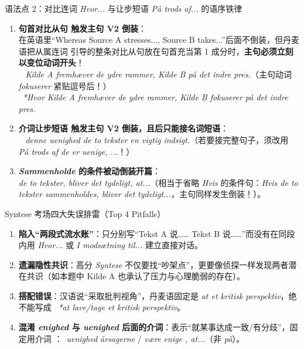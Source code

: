 \begin{grammatikbox}{语法点 2：对比连词 \textit{Hvor...} 与让步短语 \textit{På trods af...} 的语序铁律}
\begin{enumerate}
  \item \textbf{句首对比从句  触发主句 V2 倒装}：\\
    在英语里“Whereas Source A stresses..., Source B takes...”后面不倒装，但丹麦语把从属连词  引导的整条对比从句放在句首充当第 1 成分时，\textbf{主句必须立刻以变位动词开头}！\\
    \ \textit{ Kilde A fremhæver de ydre rammer,  Kilde B på det indre pres.}（主句动词 \textit{fokuserer} 紧贴逗号后！）\\
    \ \textit{*Hvor Kilde A fremhæver de ydre rammer, Kilde B fokuserer på det indre pres.}
  \item \textbf{介词让步短语  触发主句 V2 倒装，且后只能接名词短语}：\\
    \ \textit{ denne uenighed  de to tekster en vigtig indsigt.}（若要接完整句子，须改用 \textit{På trods af  de er uenige, ...}！）
  \item \textbf{\textit{Sammenholde} 的条件被动倒装开篇}：\\
    \textit{ de to tekster, bliver det tydeligt, at...}（相当于省略 \textit{Hvis} 的条件句：\textit{Hvis de to tekster sammenholdes, bliver det tydeligt...}，主句同样发生倒装！）。
\end{enumerate}
\end{grammatikbox}

\begin{grammatikbox}{Syntese 考场四大失误排雷（Top 4 Pitfalls）}
\begin{enumerate}
  \item \textbf{ 陷入“两段式流水账”}：只分别写“Tekst A 说…… Tekst B 说……”而没有在同段内用 \textit{Hvor...} 或 \textit{I modsætning til...} 建立直接对话。
  \item \textbf{ 遗漏隐性共识}：高分 \textit{Syntese} 不仅要找“吵架点”，更要像侦探一样发现两者潜在共识（如本题中 Kilde A 也承认了压力与心理脆弱的存在）。
  \item \textbf{ 搭配错误}：汉语说“采取批判视角”，丹麦语固定是 \textit{at  et kritisk perspektiv}，绝不能写成 \ \textit{*at lave/tage et kritisk perspektiv}。
  \item \textbf{ 混淆 \textit{enighed} 与 \textit{uenighed} 后面的介词}：表示“就某事达成一致/有分歧”，固定用介词 ：\ \textit{uenighed  årsagerne} / \textit{være enige , at...}（非 \textit{på}）。
\end{enumerate}
\end{grammatikbox}

